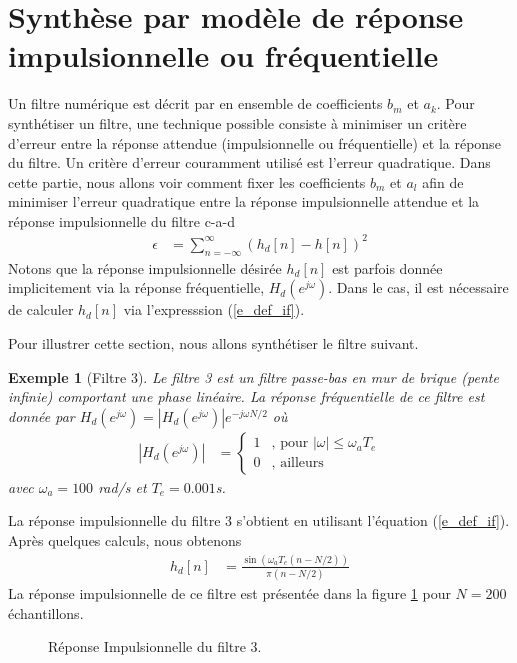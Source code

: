 \documentclass[11pt,a4paper]{IEEEtran}
\newtheorem*{exemple}{Exemple}
\begin{document}
\section{Synthèse par modèle de réponse impulsionnelle ou fréquentielle}
\label{s_design_ri}
Un filtre numérique est décrit par en ensemble de coefficients $b_m$ et $a_k$. Pour synthétiser un filtre, une technique possible consiste à minimiser un critère d'erreur entre la réponse attendue (impulsionnelle ou fréquentielle) et la réponse du filtre. Un critère d'erreur couramment utilisé est l'erreur quadratique. Dans cette partie, nous allons voir comment fixer les coefficients $b_m$ et $a_l$ afin de minimiser l'erreur quadratique entre la réponse impulsionnelle attendue et la réponse impulsionnelle du filtre c-a-d
\begin{align}
\epsilon&=\sum_{n=-\infty}^{\infty}(h_d[n]-h[n])^2\label{eq_ref_h}
\end{align}
Notons que la réponse impulsionnelle désirée $h_d[n]$ est parfois donnée implicitement via la réponse fréquentielle, $H_d(e^{j\omega})$. Dans le cas, il est nécessaire de calculer $h_d[n]$ via l'expresssion (\ref{e_def_if}).

Pour illustrer cette section, nous allons synthétiser le filtre suivant.
\begin{exemple}[Filtre 3]
Le filtre 3 est un filtre passe-bas en mur de brique (pente infinie) comportant une phase linéaire. La réponse fréquentielle de ce filtre est donnée par $H_d(e^{j\omega})=|H_d(e^{j\omega})|e^{-j\omega N/2}$ où
\begin{align}
|H_d(e^{j\omega})|&=\left\{\begin{array}{cl}
1&\textrm{, pour } |\omega| \le \omega_a T_e\\
0 &\textrm{, ailleurs}\end{array}\right.
\end{align}
avec $\omega_a=100$ rad/s et $T_e=0.001$s.
\end{exemple}
La réponse impulsionnelle du filtre 3 s'obtient en utilisant l'équation (\ref{e_def_if}). Après quelques calculs, nous obtenons
\begin{align}
h_d[n]&=\frac{\sin\left(\omega_a T_e (n-N/2)\right)}{\pi (n-N/2)}
\end{align}
La réponse impulsionnelle de ce filtre est présentée dans la figure \ref{fig_fir_ri} pour $N=200$ échantillons.
\begin{figure}[t]
\centering
{}
\caption{Réponse Impulsionnelle du filtre 3.}\label{fig_fir_ri}
\end{figure}
\end{document}
